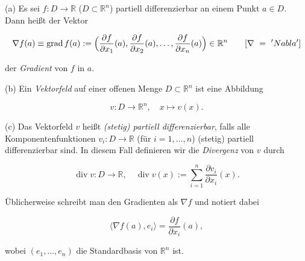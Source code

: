 \begin{definition}{}
(a) Es sei $ f : D \to \mathbb{R} $ ($D \subset \mathbb{R}^n$) partiell differenzierbar an einem Punkt $ a \in D $. Dann heißt der Vektor


$$
    \nabla f(a) \equiv \operatorname{grad} f(a) := \Bigl( \frac{\partial f}{\partial x_1}(a), \frac{\partial f}{\partial x_2}(a), \dots, \frac{\partial f}{\partial x_n}(a) \Bigr) \in \mathbb{R}^n \qquad [\nabla \ = \ 'Nabla']
$$

der \emph{Gradient} von $ f $ in $ a $.
\newline

(b) Ein \emph{Vektorfeld} auf einer offenen Menge $ D \subset \mathbb{R}^n $ ist eine Abbildung


$$
v: D \to \mathbb{R}^n,\quad x \mapsto v(x).
$$



(c) Das Vektorfeld $ v $ heißt \emph{(stetig) partiell differenzierbar}, falls alle Komponentenfunktionen $ v_i: D \to \mathbb{R} $ (für $ i=1,\dots,n $) (stetig) partiell differenzierbar sind. In diesem Fall definieren wir die \emph{Divergenz} von $ v $ durch


$$
\operatorname{div} v : D \rightarrow \mathbb{R}, \quad
\operatorname{div} v(x) := \sum_{i=1}^n \frac{\partial v_i}{\partial x_i}(x).
$$


\end{definition}

\begin{bemerkungbox}
Üblicherweise schreibt man den Gradienten als $\nabla f$ und notiert dabei


$$
\langle \nabla f(a), e_i \rangle = \frac{\partial f}{\partial x_i}(a),
$$


wobei $(e_1, \dots, e_n)$ die Standardbasis von $\mathbb{R}^n$ ist.
\end{bemerkungbox}

